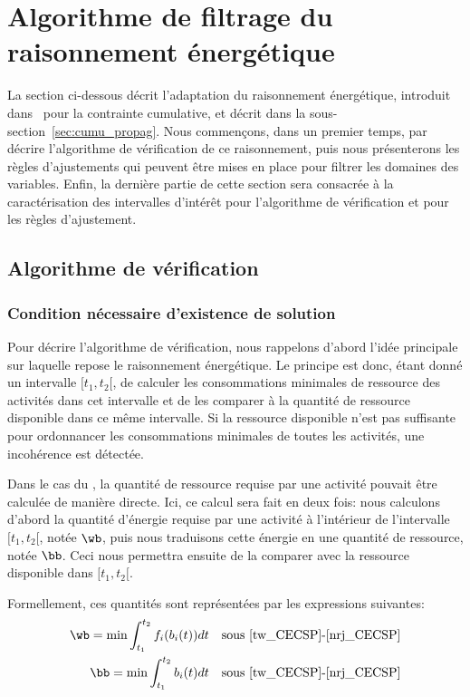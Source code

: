 \section{Algorithme de filtrage du raisonnement énergétique}
\label{sec:ER_CECSP}

La section ci-dessous décrit l'adaptation du raisonnement
énergétique, introduit dans~\cite{RELopez} pour la contrainte cumulative,
et décrit dans la sous-section~\ref{sec:cumu_propag}. Nous commençons,
dans un premier temps, par décrire l'algorithme de vérification de ce
raisonnement, puis nous présenterons les règles d'ajustements qui
peuvent être mises en place pour filtrer les domaines des
variables. Enfin, la dernière partie de cette section sera consacrée à
la caractérisation des intervalles d'intérêt pour l'algorithme de
vérification et pour les règles d'ajustement.

\subsection{Algorithme de vérification}

\subsubsection{Condition nécessaire d'existence de solution}
Pour décrire l'algorithme de vérification, nous rappelons d'abord
l'idée principale sur laquelle repose le raisonnement énergétique. Le
principe est donc, étant donné un intervalle $[t_1,t_2[$, de calculer
les consommations minimales de ressource des activités dans cet 
intervalle et de les comparer à la quantité de ressource disponible
dans ce même intervalle. Si la ressource disponible n'est pas
suffisante pour ordonnancer les consommations minimales de toutes les
activités, une incohérence est détectée.

Dans le cas du \CUSP, la quantité de ressource requise par une
activité pouvait être calculée de manière directe. Ici, ce calcul sera
fait en deux fois: nous calculons d'abord la quantité d'énergie
requise par une activité à l'intérieur de l'intervalle $[t_1,t_2{[}$,
notée $\wb$, puis nous traduisons cette énergie en une quantité de
ressource, notée $\bb$. Ceci nous permettra ensuite de la comparer
avec la ressource disponible dans $[t_1,t_2{[}$.

Formellement, ces quantités sont représentées par les expressions
suivantes: 
\begin{align}
  \wb= \min \int_{t_1}^{t_2} f_i(b_i(t))dt & & \text{sous 
                                               \eqref{tw_CECSP}-\eqref{nrj_CECSP}}\\
  \bb= \min \int_{t_1}^{t_2} b_i(t)dt & & \text{sous 
                                          \eqref{tw_CECSP}-\eqref{nrj_CECSP}} \label{eq:minConso}
\end{align}

